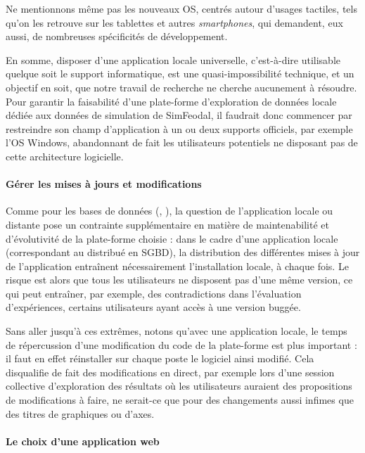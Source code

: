 		Ne mentionnons même pas les nouveaux OS, centrés autour d'usages tactiles, tels qu'on les retrouve sur les tablettes et autres \textit{smartphones}, qui demandent, eux aussi, de nombreuses spécificités de développement.
		
		En somme, disposer d'une application locale universelle, c'est-à-dire utilisable quelque soit le support informatique, est une quasi-impossibilité technique, et un objectif en soit, que notre travail de recherche ne cherche aucunement à résoudre.
		Pour garantir la faisabilité d'une plate-forme d'exploration de données locale dédiée aux données de simulation de SimFeodal, il faudrait donc commencer par restreindre son champ d'application à un ou deux supports officiels, par exemple l'OS Windows, abandonnant de fait les utilisateurs potentiels ne disposant pas de cette architecture logicielle.
	
		\paragraph*{Gérer les mises à jours et modifications}
		
		Comme pour les bases de données (, ), la question de l'application locale ou distante pose un contrainte supplémentaire en matière de maintenabilité et d'évolutivité de la plate-forme choisie : dans le cadre d'une application locale (correspondant au distribué en SGBD), la distribution des différentes mises à jour de l'application entraînent nécessairement l'installation locale, à chaque fois.
		Le risque est alors que tous les utilisateurs ne disposent pas d'une même version, ce qui peut entraîner, par exemple, des contradictions dans l'évaluation d'expériences, certains utilisateurs ayant accès à une version \og buggée\fg{}.
		
		Sans aller jusqu'à ces extrêmes, notons qu'avec une application locale, le temps de répercussion d'une modification du code de la plate-forme est plus important : il faut en effet réinstaller sur chaque poste le logiciel ainsi modifié.
		Cela disqualifie de fait des modifications \og en direct\fg{}, par exemple lors d'une session collective d'exploration des résultats où les utilisateurs auraient des propositions de modifications à faire, ne serait-ce que pour des changements aussi infimes que des titres de graphiques ou d'axes.
		
		\paragraph*{Le choix d'une application web}
		
